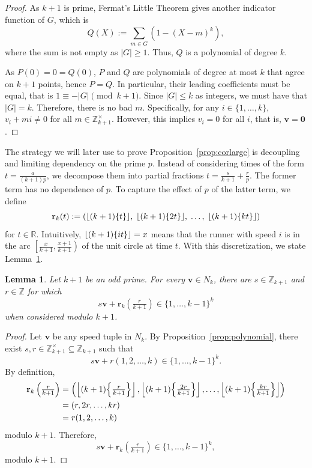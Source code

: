 \documentclass[11pt]{amsart}
\DeclarePairedDelimiter\fracpart{\{}{\}}
\newcommand{\Unit}[1]{\Z_{#1}^\times}
\newcommand{\R}{\mathbb{R}}
\newcommand{\Z}{\mathbb{Z}}
\newcommand{\rbf}{\mathbf{r}}
\newcommand{\vbf}{\mathbf{v}}
\newcommand{\onetok}{(1, 2, \dots, k)}
\newtheorem{lemma}[theorem]{Lemma}
\theoremstyle{definition}
\theoremstyle{remark}
\begin{document}
\begin{proof}
    As $k+1$ is prime, Fermat's Little Theorem gives another indicator function of $G$, which is
    \[ Q(X) := \sum_{m \in G} (1-(X-m)^k), \] 
    where the sum is not empty as $|G| \ge 1$.
    Thus, $Q$ is a polynomial of degree $k$.
    
    As $P(0) = 0 = Q(0)$, $P$ and $Q$ are polynomials of degree at most $k$ that agree on $k+1$ points, hence $P = Q$.
    In particular, their leading coefficients must be equal, that is 
    $1 \equiv -|G| \pmod{k+1}$. Since $|G| \le k$ as integers, we must have that $|G| = k$.
    Therefore, there is no bad $m$. Specifically, for any $i\in\{1,\ldots,k\}$, $v_i+mi \neq 0$
    for all $m\in\Unit{k+1}$. 
    However, this implies $v_i = 0$ for all $i$, that is, $\vbf = \mathbf{0}$.
\end{proof}

The strategy we will later use to prove Proposition~\ref{prop:corlarge} is decoupling and limiting dependency on the prime $p$. 
Instead of considering times of the form $t=\frac{a}{(k+1)p}$, we decompose them into partial fractions $t=\frac{s}{k+1}+\frac{r}{p}$.
The former term has no dependence of $p$. To capture the effect of $p$ of the latter term, we define 
\[ \rbf_k(t):=\left( \lfloor (k+1) \fracpart{t} \rfloor, \; \lfloor (k+1)\fracpart{2t} \rfloor, \; \ldots, \; \lfloor  (k+1) \fracpart{kt} \rfloor \right) \] 
for $t\in\R$.
Intuitively, $\lfloor (k+1) \fracpart{it} \rfloor = x$ means that the runner with speed $i$ is in the arc 
$\left[ \frac{x}{k+1}, \frac{x+1}{k+1} \right)$ of the unit circle at time $t$.
With this discretization, we state Lemma~\ref{lem:resolvekplusone}.

\begin{lemma}
\label{lem:resolvekplusone}
    Let $k+1$ be an odd prime. For every $\vbf \in N_k$, there are $s \in \Z_{k+1}$ and $r \in \Z$ for which 
    \[ s\vbf + \rbf_k(\tfrac r{k+1}) \in \{1,\ldots,k-1\}^k\] when considered modulo $k+1$.
\end{lemma}
\begin{proof}
  Let $\vbf$ be any speed tuple in $N_k$.
  By Proposition~\ref{prop:polynomial},
  there exist $s,r\in\Unit{k+1}\subseteq\Z_{k+1}$ such that
  \[s\vbf + r\onetok  \in \{1,\ldots,k-1\}^k.\] 
  By definition, \[\begin{split}
      \rbf_k\left(\tfrac{r}{k+1}\right) 
      &=\left(\left\lfloor (k+1)\fracpart*{\tfrac{r}{k+1}} \right\rfloor,\left\lfloor (k+1)\fracpart*{\tfrac{2r}{k+1}} \right\rfloor,\ldots, 
        \left\lfloor (k+1)\fracpart*{\tfrac{kr}{k+1}}\right\rfloor \right)\\
      &=(r,2r,\ldots,kr)\\&=r\onetok
  \end{split}\]
  modulo $k+1$. Therefore,
  \[s\vbf+\rbf_k \left( \tfrac{r}{k+1} \right) \in \{1,\ldots,k-1\}^k,\]
  modulo $k+1$.
\end{proof}
\end{document}
